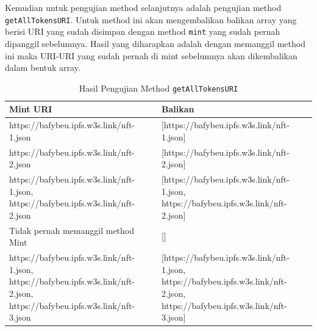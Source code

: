 Kemudian untuk pengujian method selanjutnya adalah pengujian method \texttt{getAllTokensURI}.
Untuk method ini akan mengembalikan balikan array yang berisi
URI yang sudah disimpan dengan method \texttt{mint} yang sudah pernah dipanggil sebelumnya. Hasil yang diharapkan adalah dengan memanggil method ini maka URI-URI yang sudah pernah
di mint sebelumnya akan dikembalikan dalam bentuk array.

\begin{longtable}{|p{2.5in}|p{2.5in}|}
  \caption{Hasil Pengujian Method \texttt{getAllTokensURI}}
  \label{tb:UjiGetAllTokensURI}                                                                                                                                                                                                                                 \\
  \hline
  \rowcolor[HTML]{C0C0C0}
  \textbf{Mint URI}                                                                                                            & \textbf{Balikan}                                                                                                               \\
  \hline
  https://bafybeu.ipfs.w3s.link/nft-1.json                                                                                     & [https://bafybeu.ipfs.w3s.link/nft-1.json]                                                                                     \\
  https://bafybeu.ipfs.w3s.link/nft-2.json                                                                                     & [https://bafybeu.ipfs.w3s.link/nft-2.json]                                                                                     \\
  https://bafybeu.ipfs.w3s.link/nft-1.json, https://bafybeu.ipfs.w3s.link/nft-2.json                                           & [https://bafybeu.ipfs.w3s.link/nft-1.json, https://bafybeu.ipfs.w3s.link/nft-2.json]                                           \\
  Tidak pernah memanggil method Mint                                                                                           & []                                                                                                                             \\
  https://bafybeu.ipfs.w3s.link/nft-1.json, https://bafybeu.ipfs.w3s.link/nft-2.json, https://bafybeu.ipfs.w3s.link/nft-3.json & [https://bafybeu.ipfs.w3s.link/nft-1.json, https://bafybeu.ipfs.w3s.link/nft-2.json, https://bafybeu.ipfs.w3s.link/nft-3.json] \\
  \hline
\end{longtable}

